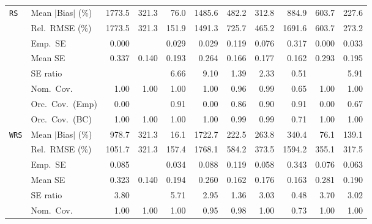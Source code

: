 \begin{landscape}
\begin{longtable}{llrrrrrrrrr}
\addlinespace[2pt]
\quad \texttt{RS} & Mean $|$Bias$|$ (\%) & 1773.5 & 321.3 & \cellcolor{rankone}76.0 & 1485.6 & 482.2 & \cellcolor{rankthree}312.8 & 884.9 & 603.7 & \cellcolor{ranktwo}227.6 \\
 & Rel.\ RMSE (\%) & 1773.5 & \cellcolor{rankthree}321.3 & \cellcolor{rankone}151.9 & 1491.3 & 725.7 & 465.2 & 1691.6 & 603.7 & \cellcolor{ranktwo}273.2 \\
 & Emp.\ SE & 0.000 &  & 0.029 & 0.029 & 0.119 & 0.076 & 0.317 & 0.000 & 0.033 \\
 & Mean SE & 0.337 & 0.140 & 0.193 & 0.264 & 0.166 & 0.177 & 0.162 & 0.293 & 0.195 \\
 & SE ratio &  &  & 6.66 & 9.10 & \cellcolor{rankone}1.39 & \cellcolor{rankthree}2.33 & \cellcolor{ranktwo}0.51 &  & 5.91 \\
 & Nom.\ Cov. & \cellcolor{rankthree}1.00 & \cellcolor{rankthree}1.00 & \cellcolor{rankthree}1.00 & \cellcolor{rankthree}1.00 & \cellcolor{rankone}0.96 & \cellcolor{ranktwo}0.99 & 0.65 & \cellcolor{rankthree}1.00 & \cellcolor{rankthree}1.00 \\
 & Orc.\ Cov.\ (Emp) & 0.00 &  & \cellcolor{rankone}0.91 & 0.00 & \cellcolor{rankthree}0.86 & \cellcolor{ranktwo}0.90 & \cellcolor{rankone}0.91 & 0.00 & 0.67 \\
 & Orc.\ Cov.\ (BC) & \cellcolor{ranktwo}1.00 & \cellcolor{ranktwo}1.00 & \cellcolor{ranktwo}1.00 & \cellcolor{ranktwo}1.00 & \cellcolor{rankone}0.99 & \cellcolor{rankone}0.99 & \cellcolor{rankthree}0.71 & \cellcolor{ranktwo}1.00 & \cellcolor{ranktwo}1.00 \\
\addlinespace[2pt]
\quad \texttt{WRS} & Mean $|$Bias$|$ (\%) & 978.7 & 321.3 & \cellcolor{rankone}16.1 & 1722.7 & 222.5 & 263.8 & 340.4 & \cellcolor{ranktwo}76.1 & \cellcolor{rankthree}139.1 \\
 & Rel.\ RMSE (\%) & 1051.7 & \cellcolor{rankthree}321.3 & \cellcolor{rankone}157.4 & 1768.1 & 584.2 & 373.5 & 1594.2 & 355.1 & \cellcolor{ranktwo}317.5 \\
 & Emp.\ SE & 0.085 &  & 0.034 & 0.088 & 0.119 & 0.058 & 0.343 & 0.076 & 0.063 \\
 & Mean SE & 0.323 & 0.140 & 0.194 & 0.260 & 0.162 & 0.176 & 0.163 & 0.281 & 0.190 \\
 & SE ratio & 3.80 &  & 5.71 & \cellcolor{rankthree}2.95 & \cellcolor{rankone}1.36 & 3.03 & \cellcolor{ranktwo}0.48 & 3.70 & 3.02 \\
 & Nom.\ Cov. & \cellcolor{rankthree}1.00 & \cellcolor{rankthree}1.00 & \cellcolor{rankthree}1.00 & \cellcolor{rankone}0.95 & \cellcolor{ranktwo}0.98 & \cellcolor{rankthree}1.00 & 0.73 & \cellcolor{rankthree}1.00 & \cellcolor{rankthree}1.00 \\

\end{longtable}
\end{landscape}
